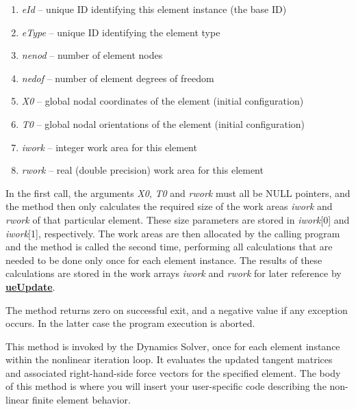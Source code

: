 \begin{enumerate}
\item{\sl eId} --
  unique ID identifying this element instance (the base ID)
\item{\sl eType} --
  unique ID identifying the element type
\item{\sl nenod} --
  number of element nodes
\item{\sl nedof} --
  number of element degrees of freedom
\item{\sl X0} --
  global nodal coordinates of the element (initial configuration)
\item{\sl T0} --
  global nodal orientations of the element (initial configuration)
\item{\sl iwork} --
  integer work area for this element
\item{\sl rwork} --
  real (double precision) work area for this element
\end{enumerate}

In the first call, the arguments {\sl X0}, {\sl T0} and {\sl rwork} must all be
NULL pointers, and the method then only calculates the required size of the work
areas {\sl iwork} and {\sl rwork} of that particular element.
These size parameters are stored in {\sl iwork}{[}0{]} and {\sl iwork}{[}1{]},
respectively. The work areas are then allocated by the calling program and the
method is called the second time, performing all calculations that are needed
to be done only once for each element instance.
The results of these calculations are stored in the work arrays {\sl iwork} and
{\sl rwork} for later reference by \protect\hyperlink{ueupdate}{\bf ueUpdate}.

The method returns zero on successful exit, and a negative value if any
exception occurs. In the latter case the program execution is aborted.


This method is invoked by the Dynamics Solver, once for each element instance
within the nonlinear iteration loop. It evaluates the updated tangent matrices
and associated right-hand-side force vectors for the specified element.
The body of this method is where you will insert your user-specific code
describing the non-linear finite element behavior.

